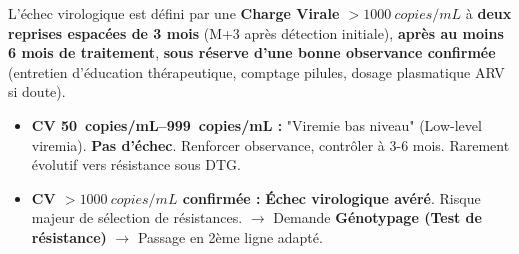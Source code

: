 \documentclass[11pt]{article}
\begin{document}
\begin{definition}
L'échec virologique est défini par une \textbf{Charge Virale $> \SI{1000}{copies/mL}$} à \textbf{deux reprises espacées de 3 mois} (M+3 après détection initiale), \textbf{après au moins 6 mois de traitement}, \textbf{sous réserve d'une bonne observance confirmée} (entretien d'éducation thérapeutique, comptage pilules, dosage plasmatique ARV si doute).
\begin{itemize}
    \item \textbf{CV \SIrange{50}{999}{copies/mL} :} "Viremie bas niveau" (Low-level viremia). \textbf{Pas d'échec}. Renforcer observance, contrôler à 3-6 mois. Rarement évolutif vers résistance sous DTG.
    \item \textbf{CV $> \SI{1000}{copies/mL}$ confirmée :} \textbf{Échec virologique avéré}. Risque majeur de sélection de résistances. $\to$ Demande \textbf{Génotypage (Test de résistance)} $\to$ Passage en 2ème ligne adapté.
\end{itemize}
\end{definition}
\end{document}
